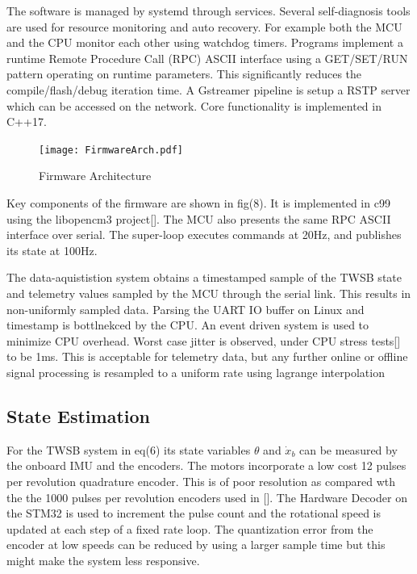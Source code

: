         The software is managed by systemd through services. 
        Several self-diagnosis tools are used for resource monitoring and auto recovery. 
        For example both the MCU and the CPU monitor each other using watchdog timers.
        Programs implement a runtime Remote Procedure Call (RPC) ASCII interface using 
        a GET/SET/RUN pattern operating on runtime parameters. This significantly reduces the compile/flash/debug 
        iteration time. A Gstreamer pipeline is setup a RSTP server which can be accessed on the network.
        Core functionality is implemented in C++17. 
        \begin{figure} [H]
            \texttt{[image: FirmwareArch.pdf]}
            \caption{Firmware Architecture}
        \end{figure}
        Key components of the firmware are shown in fig(8).
        It is implemented in c99 using the libopencm3 project[]. 
        The MCU also presents the same RPC ASCII interface over serial.
        The super-loop executes commands at 20Hz, 
        and publishes its state at 100Hz.

        The data-aquististion system obtains a timestamped sample of the TWSB state 
        and telemetry values sampled by the MCU through the serial link.
        This results in non-uniformly sampled data. Parsing the UART IO buffer on Linux 
        and timestamp is bottlnekced by the CPU. An event driven system is used to minimize CPU overhead.   
        Worst case jitter is observed, under CPU stress tests[] to be 1ms. This is acceptable for telemetry data, but
        any further online or offline signal processing is resampled to a uniform rate using 
        lagrange interpolation \cite{DataStreamProcessing}
        \pagebreak{}
    \subsection{State Estimation}
        For the TWSB system in eq(6) its state variables $\theta$ and $\dot x_b$ can be measured by the onboard IMU and the encoders.
        The motors incorporate a low cost 12 pulses per revolution quadrature encoder. This is of poor resolution as compared wth the
        the 1000 pulses per revolution encoders used in []. The Hardware Decoder on the STM32 is used to increment the pulse count 
        and the rotational speed is updated at each step of a fixed rate loop. The quantization error from the encoder at low speeds can 
        be reduced by using a larger sample time but this might make the system less responsive.

